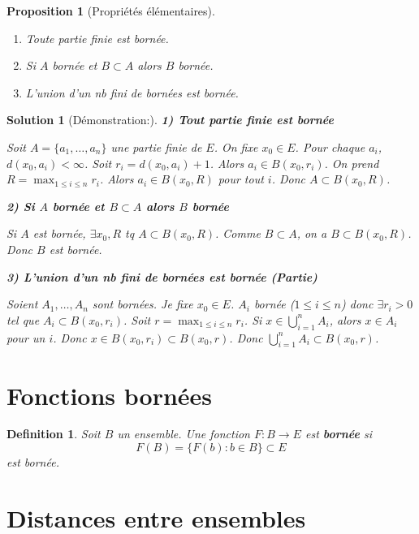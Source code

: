 \documentclass{article}
\newtheorem{proposition}{Proposition}
\newtheorem{definition}{Definition}
\newtheorem{solution}{Solution}
\begin{document}
\begin{proposition}
[Propriétés élémentaires]
\begin{enumerate}
    \item Toute partie finie est bornée.
    \item Si $A$ bornée et $B \subset A$ alors $B$ bornée.
    \item L'union d'un nb fini de bornées est bornée.
\end{enumerate}
\end{proposition}

\begin{solution}
[Démonstration:]
\textbf{1) Tout partie finie est bornée}

Soit $A = \{a_1, \dots, a_n\}$ une partie finie de $E$. On fixe $x_0 \in E$.
Pour chaque $a_i$, $d(x_0, a_i) < \infty$. Soit $r_i = d(x_0, a_i) + 1$. Alors $a_i \in B(x_0, r_i)$.
On prend $R = \max_{1 \leq i \leq n} r_i$. Alors $a_i \in B(x_0, R)$ pour tout $i$.
Donc $A \subset B(x_0, R)$.

\textbf{2) Si $A$ bornée et $B \subset A$ alors $B$ bornée}

Si $A$ est bornée, $\exists x_0, R$ tq $A \subset B(x_0, R)$. Comme $B \subset A$, on a $B \subset B(x_0, R)$. Donc $B$ est bornée.

\textbf{3) L'union d'un nb fini de bornées est bornée (Partie)}

Soient $A_1, \dots, A_n$ sont bornées. Je fixe $x_0 \in E$.
$A_i$ bornée ($1 \leq i \leq n$) donc $\exists r_i > 0$ tel que $A_i \subset B(x_0, r_i)$.
Soit $r = \max_{1 \leq i \leq n} r_i$.
Si $x \in \bigcup_{i=1}^n A_i$, alors $x \in A_i$ pour un $i$. Donc $x \in B(x_0, r_i) \subset B(x_0, r)$.
Donc $\bigcup_{i=1}^n A_i \subset B(x_0, r)$.
\end{solution}

\section{Fonctions bornées}

\begin{definition}
Soit $B$ un ensemble. Une fonction $F: B \to E$ est \textbf{bornée} si
\[
F(B) = \{F(b) : b \in B\} \subset E
\]
est bornée.
\end{definition}

\section{Distances entre ensembles}
\end{document}
